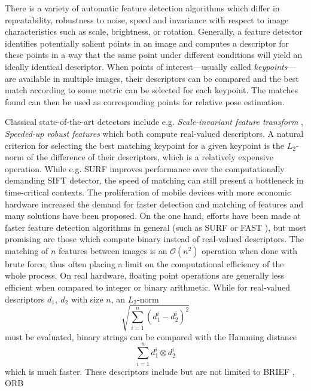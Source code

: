 There is a variety of automatic feature detection algorithms which differ in
repeatability, robustness to noise, speed and invariance with respect to image
characteristics such as scale, brightness, or rotation. 
Generally, a feature detector identifies potentially salient points in an image
and computes a descriptor for these points in a way that the same point under
different conditions will yield an ideally identical descriptor. When points of
interest---usually called \emph{keypoints}---are available in multiple images,
their descriptors can be compared and the best match according to some metric
can be selected for each keypoint. The matches found can then be used as
corresponding points for relative pose estimation.

Classical state-of-the-art detectors include e.g. \emph{Scale-invariant feature
transform} \citep{lowe1999}, \emph{Speeded-up robust features}
\citep{bay2006} which both compute real-valued descriptors. A natural criterion
for selecting the best matching keypoint for a given keypoint is the $L_2$-norm
of the difference of their descriptors, which is a relatively expensive
operation. While e.g. SURF improves performance over the computationally
demanding SIFT detector, the speed of matching can still present a bottleneck in
time-critical contexts. The proliferation of mobile devices with more economic
hardware increased the demand for faster detection and matching of features and
many solutions have been proposed. On the one hand, efforts have been made at
faster feature detection algorithms in general (such as SURF or FAST
\citep{rosten2005}), but most promising are those which compute binary instead
of real-valued descriptors. The matching of $n$ features between images is an
$\mathcal{O}(n^2)$ operation when done with brute force, thus often placing a
limit on the computational efficiency of the whole process. On real hardware,
floating point operations are generally less efficient when compared to integer
or binary arithmetic. While for real-valued descriptors $d_1,~d_2$ with size $n$,
an $L_2$-norm 
\begin{equation*}
   \sqrt{\sum_{i=1}^n (d_1^i - d_2^i)^2}
\end{equation*}
must be evaluated,
binary strings can be compared with the Hamming distance 
\begin{equation*}
   \sum_{i=1}^n d_1^i \otimes d_2^i   
\end{equation*}
which is much faster. These descriptors include but are not limited to BRIEF
\citep[Binary Robust Independent Elementary Features]{calonder2010}, ORB
